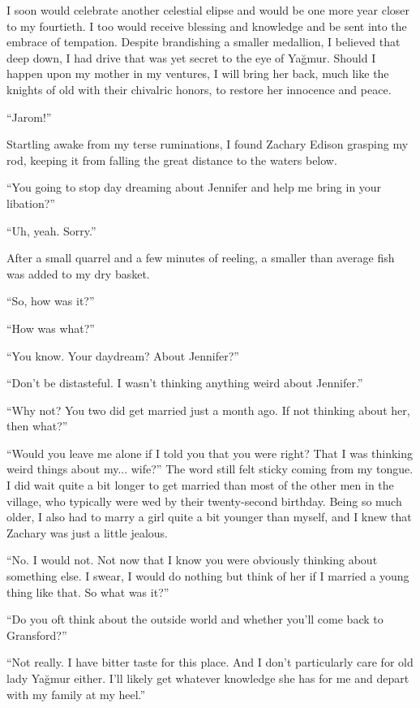 \documentclass[11pt]{memoir}
\begin{document}
I soon would celebrate another celestial elipse and would be one more year closer to my fourtieth. I too would receive blessing and knowledge and be sent into the embrace of tempation. Despite brandishing a smaller medallion, I believed that deep down, I had drive that was yet secret to the eye of Yağmur. Should I happen upon my mother in my ventures, I will bring her back, much like the knights of old with their chivalric honors, to restore her innocence and peace.

``Jarom!''

Startling awake from my terse ruminations, I found Zachary Edison grasping my rod, keeping it from falling the great distance to the waters below.

``You going to stop day dreaming about Jennifer and help me bring in your libation?''

``Uh, yeah. Sorry.''

After a small quarrel and a few minutes of reeling, a smaller than average fish was added to my dry basket.

``So, how was it?''

``How was what?''

``You know. Your daydream? About Jennifer?''

``Don't be distasteful. I wasn't thinking anything weird about Jennifer.''

``Why not? You two did get married just a month ago. If not thinking about her, then what?''

``Would you leave me alone if I told you that you were right? That I was thinking weird things about my... wife?'' The word still felt sticky coming from my tongue. I did wait quite a bit longer to get married than most of the other men in the village, who typically were wed by their twenty-second birthday. Being so much older, I also had to marry a girl quite a bit younger than myself, and I knew that Zachary was just a little jealous.

``No. I would not. Not now that I know you were obviously thinking about something else. I swear, I would do nothing but think of her if I married a young thing like that. So what was it?''

``Do you oft think about the outside world and whether you'll come back to Gransford?''

``Not really. I have bitter taste for this place. And I don't particularly care for old lady Yağmur either. I'll likely get whatever knowledge she has for me and depart with my family at my heel.''
\end{document}
